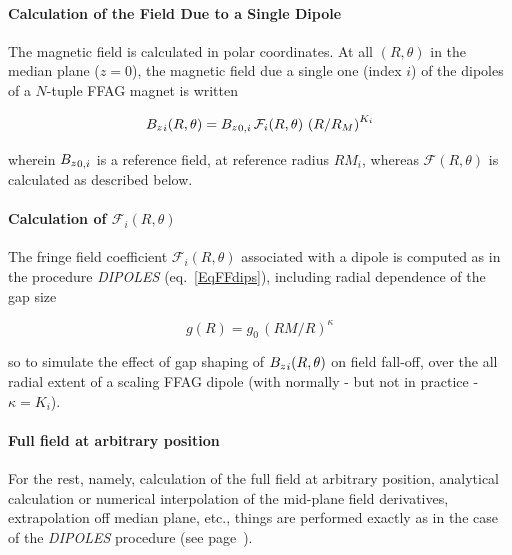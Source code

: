 \paragraph{Calculation of the Field Due to a Single Dipole} 

 \noindent The magnetic field is calculated in  polar
coordinates.  At all $(R,\theta)$ in the median plane ($z=0$), the 
magnetic field  due  a single one (index $i$) of the  dipoles  of a $N$-tuple FFAG  magnet is written 

$$ {B_z}_i(R,\theta) =  {B_z}_{0,i} \, \mathcal{F}_i(R,\theta) \, \left(   R/R_M \right)^{K_i}  $$

\noindent wherein ${B_z}_{0,i}$  is a reference field, at reference radius  $RM_{i}$, 
 whereas $ \mathcal{F}(R,\theta)$ is calculated as described below. 



\paragraph{Calculation of $\mathcal{F}_i(R,\theta) $} 

\noindent The fringe field coefficient  $\mathcal{F}_i(R,\theta) $ associated with a  dipole is computed as in the 
procedure  \textsl{DIPOLES} (eq.~\ref{EqFFdips}), including  radial dependence of the gap size 

\begin{equation}
\label{EqggvsR}
g(R) = g_0 \, (RM/R)^{\kappa}
\end{equation}

\noindent  so to simulate the effect of gap shaping of $ {B_z}_i(R,\theta)$ on 
field fall-off,  over the 
all radial extent of a scaling FFAG dipole (with normally - but not in practice - $\kappa = K_i$). 
 

\bigskip

\paragraph{Full field at arbitrary position }

For the rest, namely, calculation of the full field at arbitrary position, 
analytical   calculation or numerical interpolation of the  mid-plane field derivatives, 
extrapolation off median plane, etc., things are performed exactly as in the case of the 
 \textsl{DIPOLES} procedure (see page~\pageref{FFatAP}). 













